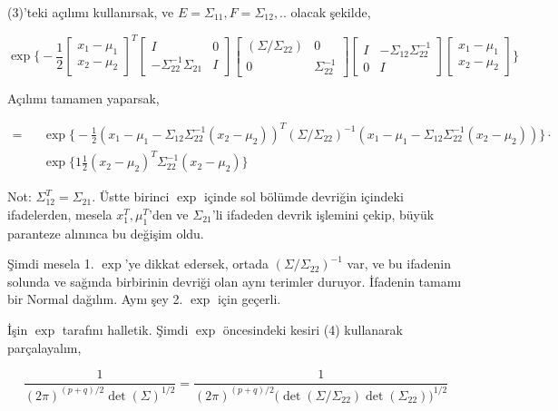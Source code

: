 \documentclass[12pt,fleqn]{article}\usepackage{../../common}
\begin{document}
(3)'teki açılımı kullanırsak, ve $E = \Sigma_{11},F=\Sigma_{12},..$ olacak şekilde,

$$ \exp 
\bigg\{ 
-\frac{ 1}{2}
\left[\begin{array}{r}
x_1 - \mu_1\\
x_2 - \mu_2
\end{array}\right]^T
\left[\begin{array}{rr}
I & 0 \\ 
-\Sigma_{22}^{-1}\Sigma_{21} & I
\end{array}\right]
\left[\begin{array}{rr}
(\Sigma/\Sigma_{22}) & 0 \\ 
0 & \Sigma_{22}^{-1} 
\end{array}\right]
\left[\begin{array}{rr}
I & -\Sigma_{12}\Sigma_{22}^{-1}  \\ 
0 & I
\end{array}\right]
\left[\begin{array}{r}
x_1 - \mu_1\\
x_2 - \mu_2
\end{array}\right]
\bigg\}
 $$

Açılımı tamamen yaparsak, 

$$ 
 \begin{array}{lll}
= && \exp \bigg\{
-\frac{1 }{2} 
(x_1 - \mu_1 - \Sigma_{12}\Sigma_{22}^{-1} (x_2 - \mu_2))^T 
(\Sigma/\Sigma_{22})^{-1} 
(x_1 - \mu_1 - \Sigma_{12}\Sigma_{22}^{-1} (x_2 - \mu_2))
\bigg\} \cdot \\
&& \exp \bigg\{
1\frac{ 1}{2}(x_2-\mu_2)^T\Sigma_{22}^{-1} (x_2-\mu_2)
 \bigg\}
\end{array}
 $$

Not: $\Sigma_{12}^T = \Sigma_{21}$. Üstte birinci $\exp$ içinde sol bölümde devriğin içindeki ifadelerden,
mesela $x_1^T,\mu_1^T$'den ve $\Sigma_{21}$'li ifadeden devrik işlemini çekip, büyük paranteze 
alınınca bu değişim oldu. 

Şimdi mesela 1. $\exp$'ye dikkat edersek, ortada $(\Sigma/\Sigma_{22})^{-1} $ var, ve bu ifadenin solunda ve sağında 
birbirinin devriği olan aynı terimler duruyor. İfadenin tamamı bir Normal
dağılım. Aynı şey 2. $\exp$ için geçerli. 

İşin $\exp$ tarafını halletik. Şimdi $\exp$ öncesindeki kesiri (4) kullanarak
parçalayalım, 

$$ 
\frac{ 1}{(2\pi)^{(p+q)/2} \det(\Sigma)^{1/2}}  = 
\frac{ 1}{(2\pi)^{(p+q)/2} \bigg(\det(\Sigma/\Sigma_{22})\det(\Sigma_{22})\bigg)^{1/2}} 
 $$
\end{document}
